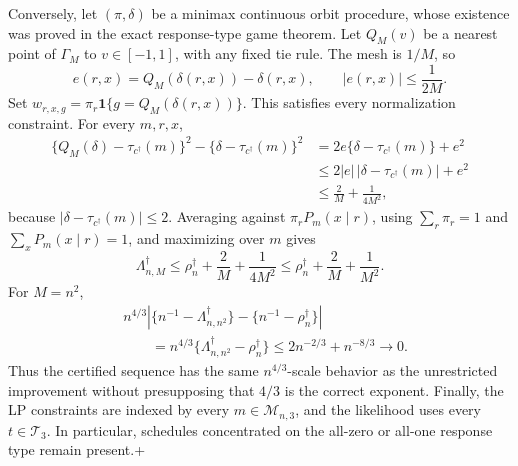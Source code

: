 Conversely, let \((\pi,\delta)\) be a minimax continuous orbit procedure, whose existence was proved in the exact response-type game theorem.  Let \(Q_M(v)\) be a nearest point of \(\Gamma_M\) to \(v\in[-1,1]\), with any fixed tie rule.  The mesh is \(1/M\), so
\[
 e(r,x)=Q_M(\delta(r,x))-\delta(r,x),
 \qquad |e(r,x)|\le\frac1{2M}.
\]
Set
\(w_{r,x,g}=\pi_r\mathbf 1\{g=Q_M(\delta(r,x))\}\).  This satisfies every normalization constraint.  For every \(m,r,x\),
\[
 \begin{aligned}
 \{Q_M(\delta)-\tau_{c^\dagger}(m)\}^2
 -\{\delta-\tau_{c^\dagger}(m)\}^2
 &=2e\{\delta-\tau_{c^\dagger}(m)\}+e^2\\
 &\le2|e|\,|\delta-\tau_{c^\dagger}(m)|+e^2\\
 &\le\frac2M+\frac1{4M^2},
 \end{aligned}
\]
because \(|\delta-\tau_{c^\dagger}(m)|\le2\).  Averaging against \(\pi_rP_m(x\mid r)\), using \(\sum_r\pi_r=1\) and \(\sum_xP_m(x\mid r)=1\), and maximizing over \(m\) gives
\[
 \Lambda_{n,M}^\dagger
 \le\rho_n^\dagger+\frac2M+\frac1{4M^2}
 \le\rho_n^\dagger+\frac2M+\frac1{M^2}.
\]
For \(M=n^2\),
\[
 \begin{aligned}
 &n^{4/3}\left|\{n^{-1}-\Lambda_{n,n^2}^\dagger\}
 -\{n^{-1}-\rho_n^\dagger\}\right|\\
 &\qquad=n^{4/3}\{\Lambda_{n,n^2}^\dagger-\rho_n^\dagger\}
 \le2n^{-2/3}+n^{-8/3}\longrightarrow0.
 \end{aligned}
\]
Thus the certified sequence has the same \(n^{4/3}\)-scale behavior as the unrestricted improvement without presupposing that \(4/3\) is the correct exponent.  Finally, the LP constraints are indexed by every \(m\in\mathcal M_{n,3}\), and the likelihood uses every \(t\in\mathcal T_3\).  In particular, schedules concentrated on the all-zero or all-one response type remain present.+